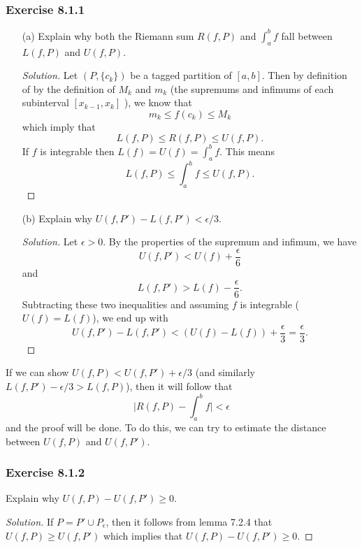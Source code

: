 \subsubsection{Exercise 8.1.1} 
\begin{enumerate}
    \item[(a)] Explain why both the Riemann sum \( R(f,P)  \) and \( \int_{ a }^{ b } f  \) fall between \( L(f,P)  \) and \( U(f,P)  \). 
        \begin{proof}[Solution]
            Let \( (P, \{ c_{k }  \} ) \) be a tagged partition of \( [a,b]  \). Then by definition of by the definition of \( M_{k }  \)  and \( m_{k }   \) (the supremums and infimums  of each subinterval \( [x_{k-1} , x_{k }] \) ), we know that 
            \[  m_{ k } \leq f(c_{ k }  )  \leq M_{k } \] which imply that 
            \[ L(f,P) \leq R(f,P) \leq U(f,P). \]
            If \( f  \) is integrable then \( L(f) = U(f) = \int_{ a }^{ b } f   \). This means 
            \[ L(f,P) \leq \int_{ a }^{ b } f \leq U(f,P).\]
        \end{proof}
        \item[(b)] Explain why \( U(f,P') - L(f, P') < \epsilon / 3.  \)
            \begin{proof}[Solution]
           Let \( \epsilon > 0  \). By the properties of the supremum and infimum, we have 
            \[ U(f,P') < U(f) + \frac{ \epsilon  }{ 6 } \] and 
            \[  L(f,P') > L(f) - \frac{ \epsilon  }{ 6 }. \] Subtracting these two inequalities and assuming \( f  \) is integrable (\( U(f) = L(f) \)), we end up with 
            \[  U(f,P') - L(f,P') < (U(f) - L(f)) + \frac{ \epsilon  }{ 3 } = \frac{ \epsilon  }{ 3 }. \]
            \end{proof}
\end{enumerate}

If we can show \( U(f,P) < U(f,P') + \epsilon / 3   \) (and similarly \( L(f,P') - \epsilon / 3 > L(f,P)  \)), then it will follow that 
\[  \Big| R(f,P) - \int_{ a }^{ b } f  \Big| < \epsilon \]
and the proof will be done. To do this, we can try to estimate the distance between \( U(f,P)  \) and \( U(f, P')  \).
\subsubsection{Exercise 8.1.2} Explain why \( U(f,P) - U(f,P') \geq 0  \).
\begin{proof}[Solution]
If \( P = P' \cup P_{\epsilon }  \), then it follows from lemma 7.2.4 that \( U(f,P) \geq U(f,P')   \) which implies that \( U(f,P) - U(f,P') \geq 0  \). 
\end{proof}

